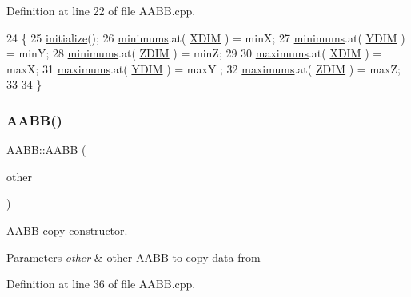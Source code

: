 Definition at line 22 of file A\+A\+B\+B.\+cpp.


\begin{DoxyCode}
24 \{
25     \hyperlink{class_a_a_b_b_aa2a1a47dc45291be16276dd397bc78fe}{initialize}();
26     \hyperlink{class_a_a_b_b_aaf1ec35e5c0258cd57e65429f93c14a2}{minimums}.at( \hyperlink{class_a_a_b_b_aac753e0248d039329b25b38d0ed9cd4f}{XDIM} ) = minX;
27     \hyperlink{class_a_a_b_b_aaf1ec35e5c0258cd57e65429f93c14a2}{minimums}.at( \hyperlink{class_a_a_b_b_a5192e3bdf0789cdc9e5f643b401e5b10}{YDIM} ) = minY;
28     \hyperlink{class_a_a_b_b_aaf1ec35e5c0258cd57e65429f93c14a2}{minimums}.at( \hyperlink{class_a_a_b_b_a3e78cd8baa6ab6199afb2cb014e0db62}{ZDIM} ) = minZ;
29 
30     \hyperlink{class_a_a_b_b_a1289c3a2e5c7a98f90d5bcdb8251a06f}{maximums}.at( \hyperlink{class_a_a_b_b_aac753e0248d039329b25b38d0ed9cd4f}{XDIM} ) = maxX;
31     \hyperlink{class_a_a_b_b_a1289c3a2e5c7a98f90d5bcdb8251a06f}{maximums}.at( \hyperlink{class_a_a_b_b_a5192e3bdf0789cdc9e5f643b401e5b10}{YDIM} ) = maxY ;
32     \hyperlink{class_a_a_b_b_a1289c3a2e5c7a98f90d5bcdb8251a06f}{maximums}.at( \hyperlink{class_a_a_b_b_a3e78cd8baa6ab6199afb2cb014e0db62}{ZDIM} ) = maxZ;
33 
34 \}
\end{DoxyCode}
\mbox{\label{class_a_a_b_b_a3f833137a852795f0ab1c9288b775ee6}} 
\subsubsection{\texorpdfstring{A\+A\+B\+B()}{AABB()}\hspace{0.1cm}{\footnotesize\ttfamily [4/4]}}
{\footnotesize\ttfamily A\+A\+B\+B\+::\+A\+A\+BB (\begin{DoxyParamCaption}\item[{const \hyperlink{class_a_a_b_b}{A\+A\+BB} \&}]{other }\end{DoxyParamCaption})}



\hyperlink{class_a_a_b_b}{A\+A\+BB} copy constructor. 


\begin{DoxyParams}{Parameters}
{\em other} & other \hyperlink{class_a_a_b_b}{A\+A\+BB} to copy data from \\
\hline
\end{DoxyParams}


Definition at line 36 of file A\+A\+B\+B.\+cpp.


